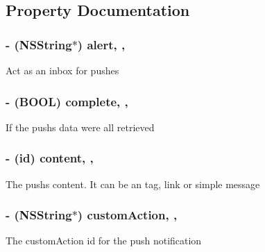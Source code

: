 \subsection{Property Documentation}
\hypertarget{interface_t_q_inbox_message_a0fdd562c5d3ee1dba53743f893cadb36}{}
\subsubsection[{alert}]{\setlength{\rightskip}{0pt plus 5cm}-\/ (N\+S\+String$\ast$) alert\hspace{0.3cm}{\ttfamily [read]}, {\ttfamily [atomic]}, {\ttfamily [assign]}}\label{interface_t_q_inbox_message_a0fdd562c5d3ee1dba53743f893cadb36}
Act as an inbox for pushes \hypertarget{interface_t_q_inbox_message_a1c0241c9106a9e9a19df35ad38d366ce}{}
\subsubsection[{complete}]{\setlength{\rightskip}{0pt plus 5cm}-\/ (B\+O\+O\+L) complete\hspace{0.3cm}{\ttfamily [read]}, {\ttfamily [atomic]}, {\ttfamily [assign]}}\label{interface_t_q_inbox_message_a1c0241c9106a9e9a19df35ad38d366ce}
If the push\textquotesingle{}s data were all retrieved \hypertarget{interface_t_q_inbox_message_a789f1e5b46d3121f8bbaaa69b05948fe}{}
\subsubsection[{content}]{\setlength{\rightskip}{0pt plus 5cm}-\/ ({\bf id}) content\hspace{0.3cm}{\ttfamily [read]}, {\ttfamily [atomic]}, {\ttfamily [assign]}}\label{interface_t_q_inbox_message_a789f1e5b46d3121f8bbaaa69b05948fe}
The push\textquotesingle{}s content. It can be an tag, link or simple message \hypertarget{interface_t_q_inbox_message_a473ac00dc8ef24707a418d3b480068b3}{}
\subsubsection[{custom\+Action}]{\setlength{\rightskip}{0pt plus 5cm}-\/ (N\+S\+String$\ast$) custom\+Action\hspace{0.3cm}{\ttfamily [read]}, {\ttfamily [atomic]}, {\ttfamily [assign]}}\label{interface_t_q_inbox_message_a473ac00dc8ef24707a418d3b480068b3}
The custom\+Action id for the push notification \hypertarget{interface_t_q_inbox_message_a733ac6a53d04d9f8844438eae605cb76}{}
